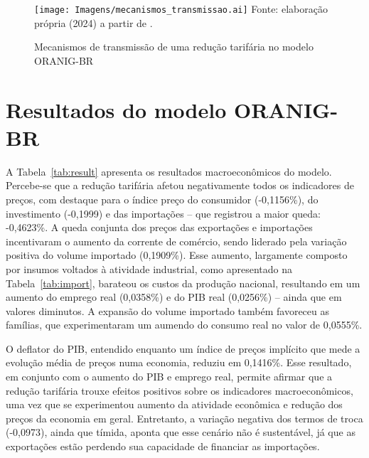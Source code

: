 \begin{figure}[H]
	\centering
	\caption{Mecanismos de transmissão de uma redução tarifária no modelo ORANIG-BR} \label{fig:mecanismos}
	\texttt{[image: Imagens/mecanismos\_transmissao.ai]}
	\footnotesize
	Fonte: elaboração própria (2024) a partir de \textcite{vinicius18}.
\end{figure}



\section{Resultados do modelo ORANIG-BR} \label{sec:resultados}

A Tabela~\ref{tab:result} apresenta os resultados macroeconômicos do modelo. Percebe-se que a redução tarifária afetou negativamente todos os indicadores de preços, com destaque para o índice preço do consumidor (-0,1156\%), do investimento (-0,1999) e das importações -- que registrou a maior queda: -0,4623\%. A queda conjunta dos preços das exportações e importações incentivaram o aumento da corrente de comércio, sendo liderado pela variação positiva do volume importado (0,1909\%). Esse aumento, largamente composto por insumos voltados à atividade industrial, como apresentado na Tabela~\ref{tab:import}, barateou os custos da produção nacional, resultando em um aumento do emprego real (0,0358\%) e do PIB real (0,0256\%) -- ainda que em valores diminutos. A expansão do volume importado também favoreceu as famílias, que experimentaram um aumendo do consumo real no valor de 0,0555\%.

O deflator do PIB, entendido enquanto um índice de preços implícito que mede a evolução média de preços numa economia, reduziu em 0,1416\%. Esse resultado, em conjunto com o aumento do PIB e emprego real, permite afirmar que a redução tarifária trouxe efeitos positivos sobre os indicadores macroeconômicos, uma vez que se experimentou aumento da atividade econômica e redução dos preços da economia em geral. Entretanto, a variação negativa dos termos de troca (-0,0973), ainda que tímida, aponta que esse cenário não é sustentável, já que as exportações estão perdendo sua capacidade de financiar as importações. 


